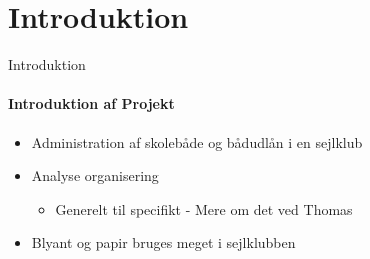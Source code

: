 \section{Introduktion}

\begin{frame}{Introduktion}

	\framesubtitle{Introduktion af Projekt}

	\begin{itemize}
		\item Administration af skolebåde og bådudlån i en sejlklub
		\item Analyse organisering
			\begin{itemize}
				\item Generelt til specifikt - Mere om det ved Thomas
			\end{itemize}
		\item Blyant og papir bruges meget i sejlklubben
	\end{itemize}
	
\end{frame}